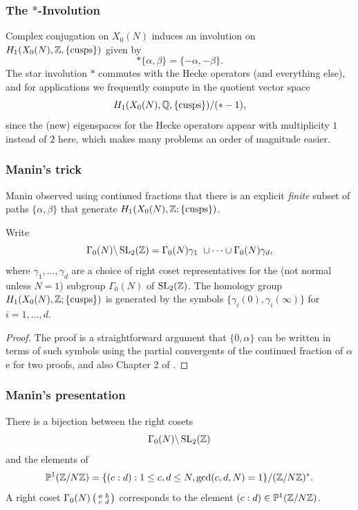 \documentclass{book}
\begin{document}
\subsubsection{The $*$-Involution}

Complex conjugation on $X_0(N)$ induces an involution
on $H_1(X_0(N),\mathbb{Z},\{\text{cusps}\})$ given
by
$$
*\{\alpha,\beta\} = \{-\alpha,-\beta\}.
$$
The star involution $*$ commutes with the Hecke operators (and
everything else), and for applications we frequently
compute in the quotient vector space
$$
  H_1(X_0(N),\mathbb{Q},\{\text{cusps}\})/(*-1),
$$
since the (new) eigenspaces for the Hecke operators appear
with multiplicity $1$ instead of $2$ here, which makes many
problems an order of magnitude easier.


\subsubsection{Manin's trick}
Manin observed using continued fractions that
there is an explicit
{\em finite} subset of paths $\{\alpha,\beta\}$
that generate $H_1(X_0(N),\mathbb{Z}; \{\text{cusps}\})$.

\begin{proposition}
Write
$$\Gamma_0(N) \backslash \operatorname{SL}_2(\mathbb{Z})
  = \Gamma_0(N)\gamma_1 \ \cup \cdots \cup \Gamma_0(N) \gamma_d ,
$$
where $\gamma_1, \ldots, \gamma_d$ are a choice of right
coset representatives for the (not normal unless $N=1$)
subgroup $\Gamma_0(N)$ of $\operatorname{SL}_2(\mathbb{Z})$.
The homology group  $H_1(X_0(N),\mathbb{Z}; \{\text{cusps}\})$
is generated by the symbols
$\{\gamma_i(0),\gamma_i(\infty)\}$ for $i=1,\ldots, d$.
\end{proposition}
\begin{proof} The proof is a straightforward argument
that $\{0,\alpha\}$ can be written in terms of such
symbols using the partial convergents of the
continued fraction of $\alpha$e \cite[Prop.~3.11]{stein:modform} for two proofs,
and also Chapter 2 of \cite{cremona:algs}.
\end{proof}


\subsubsection{Manin's presentation}

There is a bijection between the right cosets
$$\Gamma_0(N) \backslash \operatorname{SL}_2(\mathbb{Z})$$
and the elements of
$$
\mathbb{P}^1(\mathbb{Z}/N\mathbb{Z}) = \{(c:d) : 1\leq c,d\leq N, \gcd(c,d,N)=1\}/(\mathbb{Z}/N\mathbb{Z})^*.
$$
A right coset $\Gamma_0(N)\left( \begin{smallmatrix}a&b\\c&d\end{smallmatrix}\right)$ corresponds to
the element $(c:d) \in \mathbb{P}^1(\mathbb{Z}/N\mathbb{Z})$.
\end{document}
